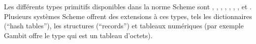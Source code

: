 

Les différents types primitifs disponibles dans la norme Scheme
sont , , ,
, , , ,
 et .
Plusieurs systèmes Scheme offrent des extensions à ces types, tels
les dictionnaires (``hash tables''), les structures (``records'') et tableaux numériques (par exemple Gambit
offre le type  qui est un tableau d'octets).

